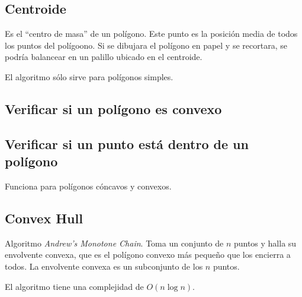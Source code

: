 \documentclass{article}
\begin{document}
\begin{multicols}{2}
\subsection{Centroide}
Es el ``centro de masa'' de un polígono. Este punto es la posición media de todos los puntos del polígoono. Si se dibujara el polígono en papel y se recortara, se podría balancear en un palillo ubicado en el centroide. 

El algoritmo sólo sirve para polígonos simples.



\subsection{Verificar si un polígono es convexo}


\subsection{Verificar si un punto está dentro de un polígono}
Funciona para polígonos cóncavos y convexos.


\subsection{Convex Hull}
Algoritmo \emph{Andrew's Monotone Chain}. Toma un conjunto de \( n \) puntos y halla su envolvente convexa, que es el polígono convexo más pequeño que los encierra a todos. La envolvente convexa es un subconjunto de los \( n \) puntos.

El algoritmo tiene una complejidad de \( O( n \log n ) \).



\end{multicols}	
\end{document}
